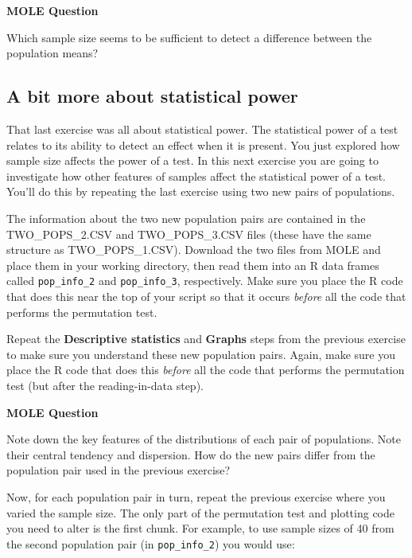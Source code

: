 \documentclass[]{book}
\begin{document}
\begin{do-something}
\textbf{MOLE Question}

Which sample size seems to be sufficient to detect a difference between
the population means?
\end{do-something}

\subsection{A bit more about statistical
power}\label{a-bit-more-about-statistical-power}

That last exercise was all about statistical power. The statistical
power of a test relates to its ability to detect an effect when it is
present. You just explored how sample size affects the power of a test.
In this next exercise you are going to investigate how other features of
samples affect the statistical power of a test. You'll do this by
repeating the last exercise using two new pairs of populations.

The information about the two new population pairs are contained in the
TWO\_POPS\_2.CSV and TWO\_POPS\_3.CSV files (these have the same
structure as TWO\_POPS\_1.CSV). Download the two files from MOLE and
place them in your working directory, then read them into an R data
frames called \texttt{pop\_info\_2} and \texttt{pop\_info\_3},
respectively. Make sure you place the R code that does this near the top
of your script so that it occurs \emph{before} all the code that
performs the permutation test.

Repeat the \textbf{Descriptive statistics} and \textbf{Graphs} steps
from the previous exercise to make sure you understand these new
population pairs. Again, make sure you place the R code that does this
\emph{before} all the code that performs the permutation test (but after
the reading-in-data step).

\begin{do-something}
\textbf{MOLE Question}

Note down the key features of the distributions of each pair of
populations. Note their central tendency and dispersion. How do the new
pairs differ from the population pair used in the previous exercise?
\end{do-something}

Now, for each population pair in turn, repeat the previous exercise
where you varied the sample size. The only part of the permutation test
and plotting code you need to alter is the first chunk. For example, to
use sample sizes of 40 from the second population pair (in
\texttt{pop\_info\_2}) you would use:
\end{document}
